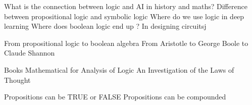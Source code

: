 \documentclass[]{book}
\theoremstyle{definition}
\theoremstyle{definition}
\theoremstyle{definition}
\theoremstyle{remark}
\begin{document}
What is the connection between logic and AI in history and maths?
Difference between propositional logic and symbolic logic Where do we
use logic in deep learning Where does boolean logic end up ? In
designing circuitsj

From propositional logic to boolean algebra From Aristotle to George
Boole to Claude Shannon

Books Mathematical for Analysis of Logic An Investigation of the Laws of
Thought

Propositions can be TRUE or FALSE Propositions can be compounded
\end{document}
